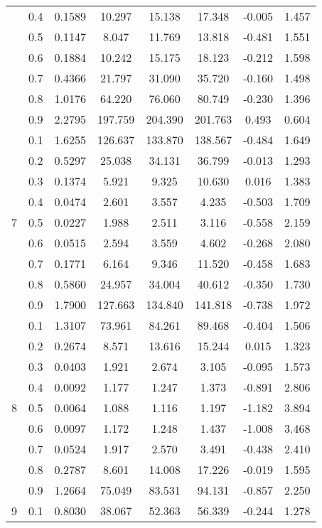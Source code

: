 \documentclass[11pt,a4paper]{report}
\begin{document}
\begin{longtable}{ | c | c || c | c | c | c | c | c | }
 & 0.4 & 0.1589 & 10.297 & 15.138 & 17.348 & -0.005 & 1.457 \\
 & 0.5 & 0.1147 & 8.047 & 11.769 & 13.818 & -0.481 & 1.551 \\
 & 0.6 & 0.1884 & 10.242 & 15.175 & 18.123 & -0.212 & 1.598 \\
 & 0.7 & 0.4366 & 21.797 & 31.090 & 35.720 & -0.160 & 1.498 \\
 & 0.8 & 1.0176 & 64.220 & 76.060 & 80.749 & -0.230 & 1.396 \\
 & 0.9 & 2.2795 & 197.759 & 204.390 & 201.763 & 0.493 & 0.604 \\
 \hline
\multirow{9}{*}{7} & 0.1 & 1.6255 & 126.637 & 133.870 & 138.567 & -0.484 & 1.649 \\
 & 0.2 & 0.5297 & 25.038 & 34.131 & 36.799 & -0.013 & 1.293 \\
 & 0.3 & 0.1374 & 5.921 & 9.325 & 10.630 & 0.016 & 1.383 \\
 & 0.4 & 0.0474 & 2.601 & 3.557 & 4.235 & -0.503 & 1.709 \\
 & 0.5 & 0.0227 & 1.988 & 2.511 & 3.116 & -0.558 & 2.159 \\
 & 0.6 & 0.0515 & 2.594 & 3.559 & 4.602 & -0.268 & 2.080 \\
 & 0.7 & 0.1771 & 6.164 & 9.346 & 11.520 & -0.458 & 1.683 \\
 & 0.8 & 0.5860 & 24.957 & 34.004 & 40.612 & -0.350 & 1.730 \\
 & 0.9 & 1.7900 & 127.663 & 134.840 & 141.818 & -0.738 & 1.972 \\
 \hline
\multirow{9}{*}{8} & 0.1 & 1.3107 & 73.961 & 84.261 & 89.468 & -0.404 & 1.506 \\
 & 0.2 & 0.2674 & 8.571 & 13.616 & 15.244 & 0.015 & 1.323 \\
 & 0.3 & 0.0403 & 1.921 & 2.674 & 3.105 & -0.095 & 1.573 \\
 & 0.4 & 0.0092 & 1.177 & 1.247 & 1.373 & -0.891 & 2.806 \\
 & 0.5 & 0.0064 & 1.088 & 1.116 & 1.197 & -1.182 & 3.894 \\
 & 0.6 & 0.0097 & 1.172 & 1.248 & 1.437 & -1.008 & 3.468 \\
 & 0.7 & 0.0524 & 1.917 & 2.570 & 3.491 & -0.438 & 2.410 \\
 & 0.8 & 0.2787 & 8.601 & 14.008 & 17.226 & -0.019 & 1.595 \\
 & 0.9 & 1.2664 & 75.049 & 83.531 & 94.131 & -0.857 & 2.250 \\
 \hline
\multirow{9}{*}{9} & 0.1 & 0.8030 & 38.067 & 52.363 & 56.339 & -0.244 & 1.278 \\

\end{longtable}
\end{document}
